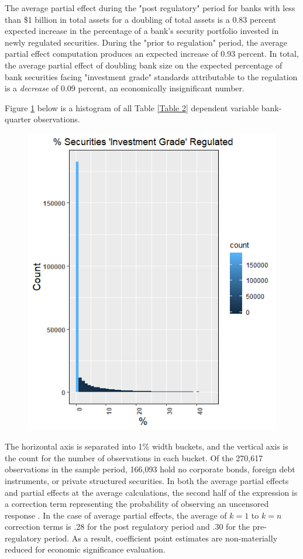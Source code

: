 \documentclass[preprint,12pt]{elsarticle}
\begin{document}
The average partial effect during the "post regulatory" period for banks with less than \$1 billion in total assets for a doubling of total assets is a 0.83 percent expected increase in the percentage of a bank's security portfolio invested in newly regulated securities. During the "prior to regulation" period, the average partial effect computation produces an expected increase of 0.93 percent.  In total, the average partial effect of doubling bank size on the expected percentage of bank securities facing "investment grade" standards attributable to the regulation is a \textit{decrease} of 0.09 percent, an economically insignificant number. 

Figure \ref{Figure 3} below is a histogram of all Table \ref{Table 2} dependent variable bank-quarter observations.  
\begin{figure}[htpb!]
\centering
\caption{}
\label{Figure 3}
\includegraphics[width = .5\linewidth]{Rplot02}
\end{figure}
The horizontal axis is separated into 1\% width buckets, and the vertical axis is the count for the number of observations in each bucket.  Of the 270,617 observations in the sample period, 166,093 hold no corporate bonds, foreign debt instruments, or private structured securities.  In both the average partial effects and partial effects at the average calculations, the second half of the expression is a correction term representing the probability of observing an uncensored response \citep{Wooldridge2013}.  In the case of average partial effects, the average of $k=1$ to $k=n$ correction terms is .28 for the post regulatory period and .30 for the pre-regulatory period.  As a result, coefficient point estimates are non-materially reduced for economic significance evaluation. 
\end{document}
